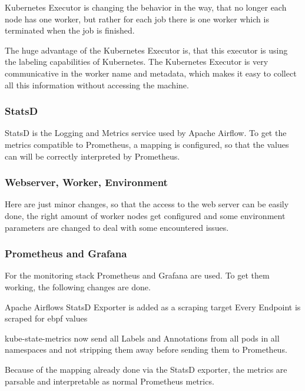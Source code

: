 \documentclass[lettersize,journal]{IEEEtran}
\begin{document}
	Kubernetes Executor is changing the behavior in the way, that no longer each node has one worker, but rather for each job there is one worker which is terminated when the job is finished.
	
	The huge advantage of the Kubernetes Executor is, that this executor is using the labeling capabilities of Kubernetes. The Kubernetes Executor is very communicative in the worker name and metadata, which makes it easy to collect all this information without accessing the machine.
	
	\subsubsection{StatsD}
	StatsD is the Logging and Metrics service used by Apache Airflow. To get the metrics compatible to Prometheus, a mapping is configured, so that the values can will be correctly interpreted by Prometheus.
	
	\subsubsection{Webserver, Worker, Environment}
	Here are just minor changes, so that the access to the web server can be easily done, the right amount of worker nodes get configured and some environment parameters are changed to deal with some encountered issues.
	
	\subsubsection{Prometheus and Grafana}
	For the monitoring stack Prometheus and Grafana are used. To get them working, the following changes are done.
	
	Apache Airflows StatsD Exporter is added as a scraping target
	Every Endpoint is scraped for ebpf values
	
	kube-state-metrics now send all Labels and Annotations from all pods in all namespaces and not stripping them away before sending them to Prometheus.
	
	Because of the mapping already done via the StatsD exporter, the metrics are parsable and interpretable as normal Prometheus metrics.
	
\end{document}
